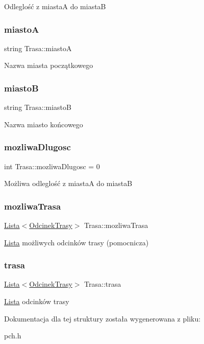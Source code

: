 Odleglość z miastaA do miastaB \mbox{\label{struct_trasa_ab7c0cbfac427d219304c268ed1619cf9}} 
\subsubsection{\texorpdfstring{miastoA}{miastoA}}
{\footnotesize\ttfamily string Trasa\+::miastoA}

Nazwa miasta początkowego \mbox{\label{struct_trasa_a007c4abb2e5790f364766d3e8faa57d2}} 
\subsubsection{\texorpdfstring{miastoB}{miastoB}}
{\footnotesize\ttfamily string Trasa\+::miastoB}

Nazwa miasto końcowego \mbox{\label{struct_trasa_ad2cc10d999b3728f994a98dbfd447c6a}} 
\subsubsection{\texorpdfstring{mozliwa\+Dlugosc}{mozliwaDlugosc}}
{\footnotesize\ttfamily int Trasa\+::mozliwa\+Dlugosc = 0}

Możliwa odleglość z miastaA do miastaB \mbox{\label{struct_trasa_addd78216be21eac061f507eb653a05b5}} 
\subsubsection{\texorpdfstring{mozliwa\+Trasa}{mozliwaTrasa}}
{\footnotesize\ttfamily \mbox{\hyperlink{class_lista}{Lista}}$<$\mbox{\hyperlink{struct_odcinek_trasy}{Odcinek\+Trasy}}$>$ Trasa\+::mozliwa\+Trasa}

\mbox{\hyperlink{class_lista}{Lista}} możliwych odcinków trasy (pomocnicza) \mbox{\label{struct_trasa_a187b2dcd9d158f54b549e15a1b12ff02}} 
\subsubsection{\texorpdfstring{trasa}{trasa}}
{\footnotesize\ttfamily \mbox{\hyperlink{class_lista}{Lista}}$<$\mbox{\hyperlink{struct_odcinek_trasy}{Odcinek\+Trasy}}$>$ Trasa\+::trasa}

\mbox{\hyperlink{class_lista}{Lista}} odcinków trasy 

Dokumentacja dla tej struktury została wygenerowana z pliku\+:\begin{DoxyCompactItemize}
\item 
pch.\+h\end{DoxyCompactItemize}
